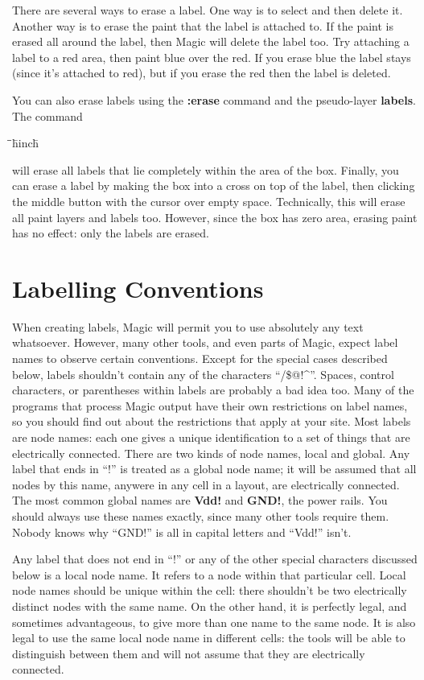 \documentclass[letterpaper,twoside,12pt]{article}
\def\hinch{\hspace*{0.5in}}
\def\starti{\begin{center}\begin{tabbing}\hinch\=\hinch\=\hinch\=hinch\=\kill}
\def\endi{\end{tabbing}\end{center}}
\def\ii{\>\>\>}
\begin{document}
There are several ways to erase a label.  One way is to select and then
delete it.  Another way is to erase the paint that the label is attached
to.  If the paint is erased all around the label, then Magic will delete
the label too.  Try attaching a
label to a red area, then paint blue over the red.
If you erase blue the label stays (since it's attached
to red), but if you erase the red then the label is deleted.

You can also erase labels using the {\bfseries :erase} command
and the pseudo-layer {\bfseries labels}.  The command

\starti
   \ii {\bfseries :erase labels}
\endi

will erase all labels that lie completely within the area of the box.
Finally, you can erase a label by making
the box into a cross on top of the label, then clicking the middle
button with the cursor over empty space.  Technically, this will
erase all paint layers and labels too.  However, since the
box has zero area, erasing paint has no effect:  only the labels
are erased.

\section{Labelling Conventions}

When creating labels, Magic will permit you
to use absolutely any text whatsoever.  However, many
other tools, and even parts of Magic, expect label names
to observe certain conventions.  Except for the special cases
described below, labels shouldn't contain any of the characters
``/\$@!\^{}''.  Spaces, control characters, or parentheses
within labels are probably a bad idea too.
Many of the programs that process Magic output
have their own restrictions on label names, so you should
find out about the restrictions that apply at your site.
Most labels are node
names: each one gives a unique identification to a set of things that
are electrically connected.  There are two kinds of node
names, local and global.  Any label that ends in ``!''
is treated as a global node name;  it will be assumed
that all nodes by this name, anywere in any cell in a layout, are
electrically connected.  The most common global names are
{\bfseries Vdd!} and {\bfseries GND!}, the power rails.  You should
always use these names exactly, since many other tools
require them.  Nobody knows why ``GND!'' is all in capital letters
and ``Vdd!'' isn't.

Any label that does not end in ``!'' or any of the other
special characters discussed below is a local node name.
It refers to a node within that particular cell.  Local
node names should be unique within the cell: there shouldn't
be two electrically distinct nodes with the same name.
On the other hand, it is perfectly legal, and sometimes
advantageous, to give more than one name to the same node.
It is also legal to use the same local node name in different
cells:  the tools will be able to distinguish between them
and will not assume that they are electrically connected.
\end{document}
